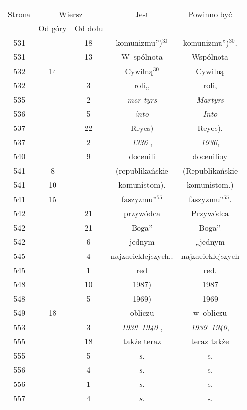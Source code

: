 \documentclass[a4paper,11pt]{article}
\begin{document}
\begin{center}
  \begin{tabular}{|c|c|c|c|c|}
    \hline
    & \multicolumn{2}{c|}{} & & \\
    Strona & \multicolumn{2}{c|}{Wiersz} & Jest
                              & Powinno być \\ \cline{2-3}
    & Od góry & Od dołu & & \\
    \hline
    531 & & 18 & komunizmu”)$^{ 30 }$\tb{.} & komunizmu”)$^{ 30 }$. \\
    531 & & 13 & W~spólnota & Wspólnota \\
    532 & 14 & & Cywilną$^{ 30 }$ & Cywilną \\
    532 & &  3 & roli,,  %
           & roli, \\
    535 & &  2 & \emph{mar tyrs} & \emph{Martyrs} \\
    536 & &  5 & \emph{into} & \emph{Into} \\
    537 & & 22 & Reyes)\tb{.} & Reyes). \\
    537 & &  2 & \emph{1936} , & \emph{1936}, \\
    540 & &  9 & docenili & doceniliby \\
    541 &  8 & & (republikańskie & (Republikańskie \\
    541 & 10 & & komunistom). & komunistom.) \\
    541 & 15 & & faszyzmu”$^{ 55 }$\tb{.} & faszyzmu”$^{ 55 }$. \\
    542 & & 21 & przywódca & Przywódca \\
    542 & & 21 & Boga” & Boga”. \\
    542 & &  6 & jednym & „jednym \\
    545 & &  4 & najzacieklejszych,. & najzacieklejszych \\
    545 & &  1 & red & red. \\
    548 & & 10 & 1987) & 1987 \\
    548 & &  5 & 1969) & 1969 \\
    549 & 18 & & obliczu & w~obliczu \\
    553 & &  3 & \emph{1939--1940} , & \emph{1939--1940}, \\
    555 & & 18 & także teraz & teraz także \\
    555 & &  5 & \emph{s.} & s. \\
    556 & &  4 & \emph{s.} & s. \\
    556 & &  1 & \emph{s.} & s. \\
    557 & &  4 & \emph{s.} & s. \\

\end{tabular}
\end{center}
\end{document}
